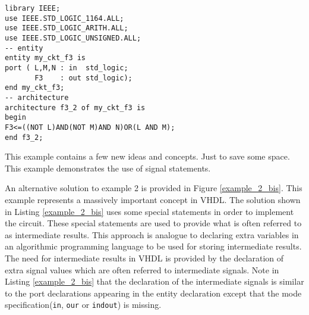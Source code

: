 \begin{minipage}{0.55\linewidth}
\begin{lstlisting}[label=example_2, caption=Solution of example 2.]
library IEEE;
use IEEE.STD_LOGIC_1164.ALL;
use IEEE.STD_LOGIC_ARITH.ALL;
use IEEE.STD_LOGIC_UNSIGNED.ALL;
-- entity
entity my_ckt_f3 is
port ( L,M,N : in  std_logic;
       F3    : out std_logic);
end my_ckt_f3;
-- architecture
architecture f3_2 of my_ckt_f3 is
begin
F3<=((NOT L)AND(NOT M)AND N)OR(L AND M);
end f3_2;
\end{lstlisting}
\end{minipage}
\begin{minipage}{0.4\linewidth}
\begin{flushright}
\end{flushright}
\end{minipage}

This example contains a few new ideas and concepts. Just to save some space. This example demonstrates the use of signal statements. 

An alternative solution to example 2 is provided in Figure \ref{example_2_bis}. This example represents a massively important concept in VHDL. The solution shown in Listing \ref{example_2_bis} uses some special statements in order to implement the circuit. These special statements are used to provide what is often referred to as intermediate results. This approach is analogue to declaring extra variables in an algorithmic programming language to be used for storing intermediate results. The need for intermediate results in VHDL is provided by the declaration of extra signal values which are often referred to intermediate signals. Note in Listing \ref{example_2_bis} that the declaration of the intermediate signals is similar to the port declarations appearing in the entity declaration except that the mode specification(\texttt{in}, \texttt{our} or \texttt{indout}) is missing. 

